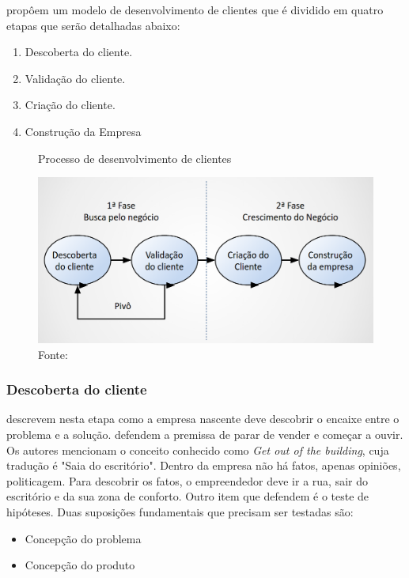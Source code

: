  propôem um modelo de desenvolvimento de clientes que é dividido em quatro etapas que serão detalhadas abaixo:
\begin{enumerate}
\item Descoberta do cliente.
\item Validação do cliente.
\item Criação do cliente.
\item Construção da Empresa
\end{enumerate}

\begin{figure}[H]
\caption{Processo de desenvolvimento de clientes}
\centerline{\includegraphics[scale=0.3]{img/desenvolvimento_de_clientes}}
\label{fig:desenvolvimento_de_clientes}
\caption* {Fonte: }
\end{figure}

\subsubsection{Descoberta do cliente}
\label{cha:descoberta_do_cliente}
 descrevem nesta etapa como a empresa nascente deve descobrir o encaixe entre o problema e a solução.
 defendem a premissa de parar de vender e começar a ouvir. Os autores mencionam o conceito conhecido como \textit{Get out of the building}, cuja tradução é "Saia do escritório". Dentro da empresa não há fatos, apenas opiniões, politicagem. Para descobrir os fatos, o empreendedor deve ir a rua, sair do escritório e da sua zona de conforto.
Outro item que  defendem é o teste de hipóteses. Duas suposições fundamentais que precisam ser testadas são: 
\begin{itemize}
\item Concepção do problema
\item Concepção do produto
\end{itemize}

